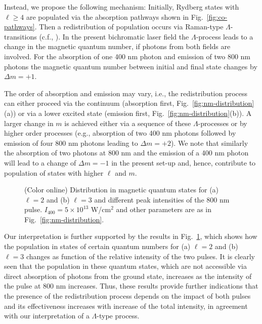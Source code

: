Instead, we propose the following mechanism: Initially, Rydberg states with $\ell \ge 4$ are populated via the absorption pathways shown in Fig.\ \ref{fig:co-pathways}. Then a redistribution of population occurs via Raman-type $\Lambda$-transitions (c.f., \cite{gray1978,fedorov1996}). In the present bichromatic laser field the $\Lambda$-process leads to a change in the magnetic quantum number, if photons from both fields are involved. For the absorption of one 400 nm photon and emission of two 800 nm photons the magnetic quantum number between initial and final state changes by $\Delta m = +1$.
 
The order of absorption and emission may vary, i.e., the redistribution process can either proceed via the continuum (absorption first, Fig.~\ref{fig:nm-distribution}(a)) or via a lower excited state (emission first, Fig.~\ref{fig:nm-distribution}(b)). A larger change in $m$ is achieved either via a sequence of these $\Lambda$-processes or by higher order processes (e.g., absorption of two 400 nm photons followed by emission of four 800 nm photons leading to $\Delta m = +2$). We note that similarly the absorption of two photons at 800 nm and the emission of a 400 nm photon will lead to a change of $\Delta m = -1$ in the present set-up and, hence, contribute to population of states with higher $\ell$ and $m$.

\begin{figure}[!ht]
\caption{\label{fig:nm-fixedl-distribution}
(Color online) 
{
Distribution in magnetic quantum states for (a) $\ell = 2$ and (b) $\ell = 3 $ and different peak intensities of the 800 nm pulse. $I_{400} = 5\times 10^{13}$ W/cm$^2$ and other parameters are as in Fig.~\ref{fig:nm-distribution}.}
}
\end{figure}

Our interpretation is further supported by the results in Fig.~\ref{fig:nm-fixedl-distribution}, which shows how the population in states of certain quantum numbers for (a) $\ell = 2$ and (b) $\ell = 3$ changes as function of the relative intensity of the two pulses. It is clearly seen that the population in these quantum states, which are not accessible via direct absorption of photons from the ground state, increases as the intensity of the pulse at 800 nm increases. Thus, these results provide further indications that the presence of the redistribution process depends on the impact of both pulses and its effectiveness increases with increase of the total intensity, in agreement with our interpretation of a $\Lambda$-type process.

